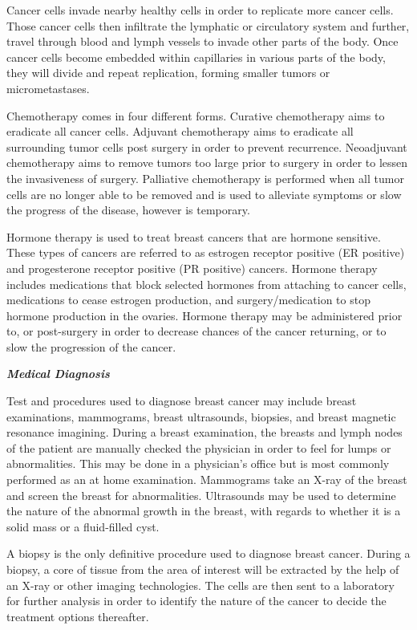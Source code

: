 \documentclass{bioinfo}
\begin{document}
Cancer cells invade nearby healthy cells in order to replicate more cancer cells. Those cancer cells then infiltrate the lymphatic or circulatory system and further, travel through blood and lymph vessels to invade other parts of the body. Once cancer cells become embedded within capillaries in various parts of the body, they will divide and repeat replication, forming smaller tumors or micrometastases. 

Chemotherapy comes in four different forms. Curative chemotherapy aims to eradicate all cancer cells. Adjuvant chemotherapy aims to eradicate all surrounding tumor cells post surgery in order to prevent recurrence. Neoadjuvant chemotherapy aims to remove tumors too large prior to surgery in order to lessen the invasiveness of surgery. Palliative chemotherapy is performed when all tumor cells are no longer able to be removed and is used to alleviate symptoms or slow the progress of the disease, however is temporary. 

Hormone therapy is used to treat breast cancers that are hormone sensitive. These types of cancers are referred to as estrogen receptor positive (ER positive) and progesterone receptor positive (PR positive) cancers. Hormone therapy includes medications that block selected hormones from attaching to cancer cells, medications to cease estrogen production, and surgery/medication to stop hormone production in the ovaries. Hormone therapy may be administered prior to, or post-surgery in order to decrease chances of the cancer returning, or to slow the progression of the cancer. \cite{hormone-therapy}

{\textbf {\emph{Medical Diagnosis}}}

Test and procedures used to diagnose breast cancer may include breast examinations, mammograms, breast ultrasounds, biopsies, and breast magnetic resonance imagining. During a breast examination, the breasts and lymph nodes of the patient are manually checked the physician in order to feel for lumps or abnormalities. This may be done in a physician’s office but is most commonly performed as an at home examination. Mammograms take an X-ray of the breast and screen the breast for abnormalities. Ultrasounds may be used to determine the nature of the abnormal growth in the breast, with regards to whether it is a solid mass or a fluid-filled cyst. 

A biopsy is the only definitive procedure used to diagnose breast cancer. During a biopsy, a core of tissue from the area of interest will be extracted by the help of an X-ray or other imaging technologies. The cells are then sent to a laboratory for further analysis in order to identify the nature of the cancer to decide the treatment options thereafter. 
\end{document}
